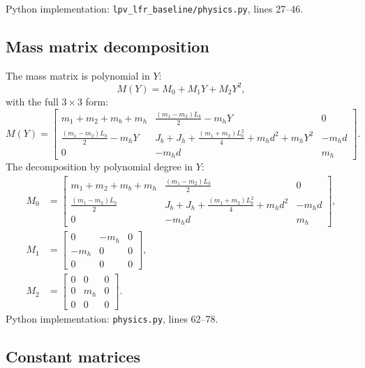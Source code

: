 \documentclass[11pt,a4paper]{article}
\newcommand{\pyfile}[1]{\texttt{#1}}
\begin{document}
Python implementation: \pyfile{lpv\_lfr\_baseline/physics.py}, lines 27--46.

\subsection{Mass matrix decomposition}
\label{sec:mass_matrix}

The mass matrix is polynomial in $Y$:
\begin{equation}
\label{eq:MY}
M(Y) = M_0 + M_1 Y + M_2 Y^2,
\end{equation}
with the full $3 \times 3$ form:
\begin{equation}
\label{eq:MY_full}
M(Y) = \begin{bmatrix}
m_1 + m_2 + m_b + m_h & \frac{(m_1 - m_2) L_b}{2} - m_h Y & 0 \\[4pt]
\frac{(m_1 - m_2) L_b}{2} - m_h Y & J_b + J_h + \frac{(m_1 + m_2) L_b^2}{4} + m_h d^2 + m_h Y^2 & -m_h d \\[4pt]
0 & -m_h d & m_h
\end{bmatrix}.
\end{equation}
The decomposition by polynomial degree in $Y$:
\begin{align}
\label{eq:M0}
M_0 &= \begin{bmatrix}
m_1 + m_2 + m_b + m_h & \frac{(m_1 - m_2) L_b}{2} & 0 \\[3pt]
\frac{(m_1 - m_2) L_b}{2} & J_b + J_h + \frac{(m_1 + m_2) L_b^2}{4} + m_h d^2 & -m_h d \\[3pt]
0 & -m_h d & m_h
\end{bmatrix}, \\[6pt]
\label{eq:M1}
M_1 &= \begin{bmatrix}
0 & -m_h & 0 \\
-m_h & 0 & 0 \\
0 & 0 & 0
\end{bmatrix}, \\[6pt]
\label{eq:M2}
M_2 &= \begin{bmatrix}
0 & 0 & 0 \\
0 & m_h & 0 \\
0 & 0 & 0
\end{bmatrix}.
\end{align}
Python implementation: \pyfile{physics.py}, lines 62--78.

\subsection{Constant matrices}
\end{document}
